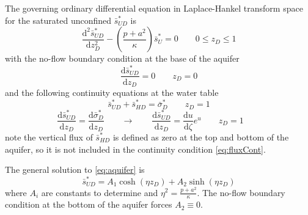 \documentclass[12pt,letterpaper]{article}
\begin{document}
The governing ordinary differential equation in Laplace-Hankel
transform space for the saturated unconfined $\bar{s}^{\ast}_{UD}$ is
\begin{equation}
  \label{eq:aquifer}
  \frac{\mathrm{d}^2 \bar{s}_{UD}^{\ast}}{\mathrm{d} z_D^2} - \left( \frac{p + a^2}{\kappa} \right)\bar{s}_U^{\ast} = 0 \qquad 0 \le z_D \le 1
\end{equation}
with the no-flow boundary condition at the base of the aquifer
\begin{equation}\nonumber
 \frac{\mathrm{d} \bar{s}_{UD}^{\ast}}{\mathrm{d} z_D} = 0 \qquad z_D=0 
\end{equation}
and the following continuity equations at the water table
\begin{equation}
  \label{eq:headCont}
  \bar{s}_{UD}^{\ast} + \bar{s}_{HD}^{\ast} = \bar{\sigma}_D^{\ast} \qquad z_D=1
\end{equation}
\begin{equation}
  \label{eq:fluxCont}
  \frac{\mathrm{d} \bar{s}_{UD}^{\ast}}{\mathrm{d} z_D}  = \frac{\mathrm{d}
    \bar{\sigma}_D^{\ast}}{\mathrm{d} z_D} \qquad \rightarrow \qquad \frac{\mathrm{d} \bar{s}_{UD}^{\ast}}{\mathrm{d} z_D}  = \frac{\mathrm{d}u}{\mathrm{d} \zeta} e^u \qquad z_D=1
  \qquad 
\end{equation}
note the vertical flux of $\bar{s}_{HD}^{\ast}$ is defined as zero at
the top and bottom of the aquifer, so it is not included in the
continuity condition \eqref{eq:fluxCont}.

The general solution to \eqref{eq:aquifer} is 
\begin{equation}
  \label{eq:su}
  \bar{s}_{UD}^{\ast} = A_1 \cosh(\eta z_D) + A_2 \sinh(\eta z_D)
\end{equation}
where $A_i$ are constants to determine and $\eta^2 = \frac{p + a^2}{\kappa}$.  The no-flow boundary condition at the bottom of the aquifer forces $A_2\equiv 0$.  
\end{document}
